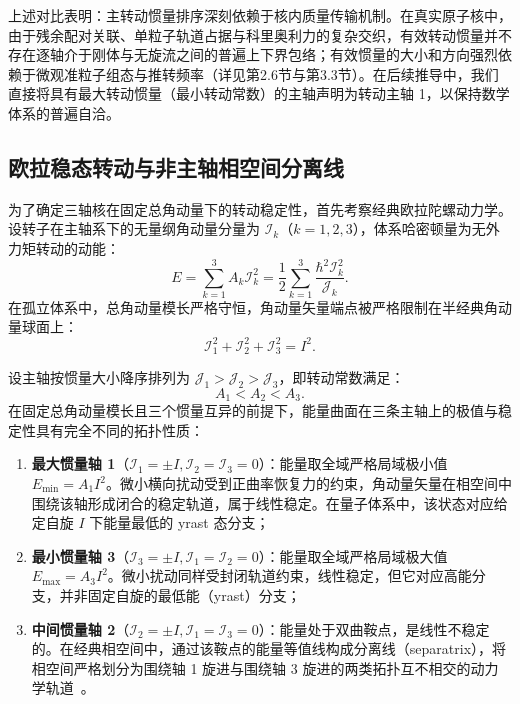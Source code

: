 上述对比表明：主转动惯量排序深刻依赖于核内质量传输机制。在真实原子核中，由于残余配对关联、单粒子轨道占据与科里奥利力的复杂交织，有效转动惯量并不存在逐轴介于刚体与无旋流之间的普遍上下界包络；有效惯量的大小和方向强烈依赖于微观准粒子组态与推转频率（详见第2.6节与第3.3节）。在后续推导中，我们直接将具有最大转动惯量（最小转动常数）的主轴声明为转动主轴 1，以保持数学体系的普遍自洽。

\subsection{欧拉稳态转动与非主轴相空间分离线}\label{sec:3-2-2}

为了确定三轴核在固定总角动量下的转动稳定性，首先考察经典欧拉陀螺动力学。设转子在主轴系下的无量纲角动量分量为 $\mathcal{I}_k$（$k = 1, 2, 3$），体系哈密顿量为无外力矩转动的动能：
\begin{equation}\label{eq:3-2-classical-H}
E = \sum_{k=1}^3 A_k \mathcal{I}_k^2 = \frac{1}{2} \sum_{k=1}^3 \frac{\hbar^2 \mathcal{I}_k^2}{\mathcal{J}_k}.
\end{equation}
在孤立体系中，总角动量模长严格守恒，角动量矢量端点被严格限制在半经典角动量球面上：
\begin{equation}\label{eq:3-2-I-sphere}
\mathcal{I}_1^2 + \mathcal{I}_2^2 + \mathcal{I}_3^2 = I^2.
\end{equation}

设主轴按惯量大小降序排列为 $\mathcal{J}_1 > \mathcal{J}_2 > \mathcal{J}_3$，即转动常数满足：
\begin{equation}\label{eq:3-2-A-order}
A_1 < A_2 < A_3.
\end{equation}
在固定总角动量模长且三个惯量互异的前提下，能量曲面在三条主轴上的极值与稳定性具有完全不同的拓扑性质：
\begin{enumerate}
\item \textbf{最大惯量轴 1}（$\mathcal{I}_1 = \pm I, \mathcal{I}_2 = \mathcal{I}_3 = 0$）：能量取全域严格局域极小值 $E_{\min} = A_1 I^2$。微小横向扰动受到正曲率恢复力的约束，角动量矢量在相空间中围绕该轴形成闭合的稳定轨道，属于线性稳定。在量子体系中，该状态对应给定自旋 $I$ 下能量最低的 yrast 态分支；
\item \textbf{最小惯量轴 3}（$\mathcal{I}_3 = \pm I, \mathcal{I}_1 = \mathcal{I}_2 = 0$）：能量取全域严格局域极大值 $E_{\max} = A_3 I^2$。微小扰动同样受封闭轨道约束，线性稳定，但它对应高能分支，并非固定自旋的最低能（yrast）分支；
\item \textbf{中间惯量轴 2}（$\mathcal{I}_2 = \pm I, \mathcal{I}_1 = \mathcal{I}_3 = 0$）：能量处于双曲鞍点，是线性不稳定的。在经典相空间中，通过该鞍点的能量等值线构成分离线（separatrix），将相空间严格划分为围绕轴 1 旋进与围绕轴 3 旋进的两类拓扑互不相交的动力学轨道~\cite{book-raduta-coherent-states}。
\end{enumerate}

